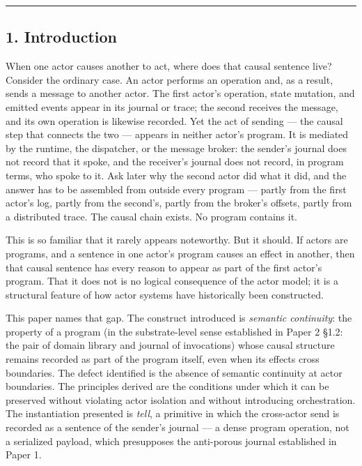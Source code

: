 \documentclass[
]{article}
\begin{document}
\begin{center}\rule{0.5\linewidth}{0.5pt}\end{center}

\subsection{1. Introduction}\label{introduction}

When one actor causes another to act, where does that causal sentence
live? Consider the ordinary case. An actor performs an operation and, as
a result, sends a message to another actor. The first actor's operation,
state mutation, and emitted events appear in its journal or trace; the
second receives the message, and its own operation is likewise recorded.
Yet the act of sending --- the causal step that connects the two ---
appears in neither actor's program. It is mediated by the runtime, the
dispatcher, or the message broker: the sender's journal does not record
that it spoke, and the receiver's journal does not record, in program
terms, who spoke to it. Ask later why the second actor did what it did,
and the answer has to be assembled from outside every program --- partly
from the first actor's log, partly from the second's, partly from the
broker's offsets, partly from a distributed trace. The causal chain
exists. No program contains it.

This is so familiar that it rarely appears noteworthy. But it should. If
actors are programs, and a sentence in one actor's program causes an
effect in another, then that causal sentence has every reason to appear
as part of the first actor's program. That it does not is no logical
consequence of the actor model; it is a structural feature of how actor
systems have historically been constructed.

This paper names that gap. The construct introduced is \emph{semantic
continuity}: the property of a program (in the substrate-level sense
established in Paper 2 §1.2: the pair of domain library and journal of
invocations) whose causal structure remains recorded as part of the
program itself, even when its effects cross boundaries. The defect
identified is the absence of semantic continuity at actor boundaries.
The principles derived are the conditions under which it can be
preserved without violating actor isolation and without introducing
orchestration. The instantiation presented is \emph{tell}, a primitive
in which the cross-actor send is recorded as a sentence of the sender's
journal --- a dense program operation, not a serialized payload, which
presupposes the anti-porous journal established in Paper 1.
\end{document}
